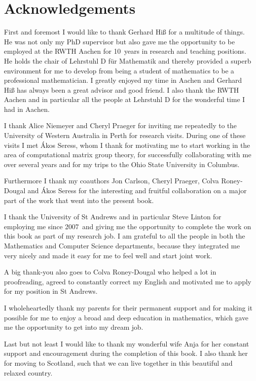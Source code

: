 \section*{Acknowledgements}

First and foremost I would like to thank Gerhard Hi\ss{} for a multitude
of things. He was not only my PhD supervisor but also gave me the
opportunity to be employed at the RWTH Aachen for 10~years in research
and teaching positions. He holds the chair of Lehrstuhl D f\"ur
Mathematik and thereby provided a superb environment for me to develop
from being a student of mathematics to be a professional mathematician.
I greatly enjoyed my time in Aachen and Gerhard Hi\ss{} has always been a
great advisor and good friend. I also thank the RWTH Aachen and in
particular all the people at Lehrstuhl D for the wonderful time I had
in Aachen.

I thank Alice Niemeyer and Cheryl Praeger for inviting me
repeatedly to the University of Western Australia in Perth for
research visits. During one of these visits I met \'Akos Seress, whom
I thank for motivating me to start working in the area of
computational matrix group theory, for successfully collaborating with
me over several years and for my trips to the Ohio State
University in Columbus.

Furthermore I thank my coauthors Jon Carlson, Cheryl Praeger, 
Colva Roney-Dougal and \'Akos Seress for the interesting and fruitful
collaboration on a major part of the work that went into the present book.

I thank the University of St Andrews and in particular Steve Linton
for employing me since 2007~and giving me the opportunity to complete
the work on this book as part of my research job. I am grateful to all the
people in both the Mathematics and Computer Science departments, because
they integrated me very nicely and made it easy for me to feel well
and start joint work.

A big thank-you also goes to Colva Roney-Dougal who helped a lot in
proofreading, agreed to constantly correct my English and motivated me to
apply for my position in St Andrews.

I wholeheartedly thank my parents for their permanent support and
for making it possible for me to enjoy a broad and deep education in 
mathematics, which gave me the opportunity to get into my dream job.

Last but not least I would like to thank my wonderful wife Anja for
her constant support and encouragement during the completion of this
book. I also thank her for moving to Scotland, such that we can live
together in this beautiful and relaxed country.

\renewcommand{\thechapter}{\Roman{chapter}}
